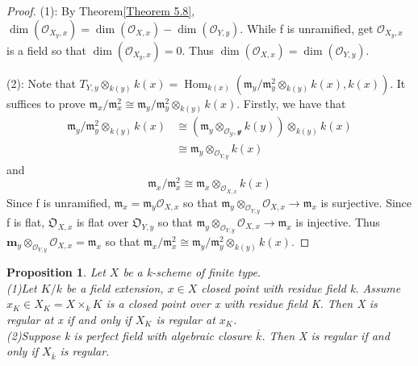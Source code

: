 \documentclass{ctexart}
\newtheorem{proposition}{Proposition}[section]
\renewcommand{\hom}{\operatorname{Hom}}
\begin{document}
\begin{proof}
    (1): By Theorem\ref{Theorem 5.8}, $\dim(\mathcal{O}_{X_{y}, x}) = \dim(\mathcal{O}_{X, x}) - \dim(\mathcal{O}_{Y, y})$.
    While f is unramified, get $\mathcal{O}_{X_{y}, x}$ is a field so that $\dim(\mathcal{O}_{X_{y}, x}) = 0$.
    Thus $\dim(\mathcal{O}_{X, x}) = \dim(\mathcal{O}_{Y, y})$.
    \par
    (2): Note that $T_{Y, y} \otimes_{k(y)} k(x) = \hom_{k(x)}(\mathfrak{m}_{y}/\mathfrak{m}_{y}^{2} \otimes_{k(y)} k(x), k(x))$.
    It suffices to prove $\mathfrak{m}_{x}/\mathfrak{m}_{x}^{2} \cong \mathfrak{m}_{y}/\mathfrak{m}_{y}^{2} \otimes_{k(y)} k(x)$.
    Firstly, we have that
    \begin{equation*}
        \begin{split}
            \mathfrak{m}_{y}/\mathfrak{m}_{y}^{2} \otimes_{k(y)} k(x) & \cong (\mathfrak{m}_{y} \otimes_{\mathcal{O_{Y}, y}} k(y)) \otimes_{k(y)} k(x) \\
            & \cong \mathfrak{m}_{y} \otimes_{\mathcal{O}_{Y, y}} k(x)
        \end{split}
    \end{equation*}
    and 
    \begin{equation*}
        \mathfrak{m}_{x}/\mathfrak{m}_{x}^{2} \cong \mathfrak{m}_{x} \otimes_{\mathcal{O}_{X, x}} k(x) 
    \end{equation*}
    Since f is unramified, $\mathfrak{m}_{x} = \mathfrak{m}_{y}\mathcal{O}_{X, x}$ so that $\mathfrak{m}_{y} \otimes_{\mathcal{O}_{Y, y}} \mathcal{O}_{X, x} \longrightarrow \mathfrak{m}_{x}$ is surjective.
    Since f is flat, $\mathfrak{O}_{X, x}$ is flat over $\mathfrak{O}_{Y, y}$ so that $\mathfrak{m}_{y} \otimes_{\mathcal{O}_{Y, y}} \mathcal{O}_{X, x} \longrightarrow \mathfrak{m}_{x}$ is injective.
    Thus $\mathbf{m}_{y} \otimes_{\mathcal{O}_{Y, y}} \mathcal{O}_{X, x} = \mathfrak{m}_{x}$ so that $\mathfrak{m}_{x}/\mathfrak{m}_{x}^{2} \cong \mathfrak{m}_{y}/\mathfrak{m}_{y}^{2} \otimes_{k(y)} k(x)$.
\end{proof}
\begin{proposition}
    Let $X$ be a k-scheme of finite type. \\
    (1)Let $K/k$ be a field extension, $x\in X$ closed point with residue field k.
    Assume $x_{K}\in X_{K} = X \times_{k} K$ is a closed point over x with residue field K.
    Then X is regular at x if and only if $X_{K}$ is regular at $x_{K}$. \\
    (2)Suppose k is perfect field with algebraic closure $\overline{k}$.
    Then X is regular if and only if $X_{\overline{k}}$ is regular.
    \label{Proposition 5.9}
\end{proposition}
\end{document}
